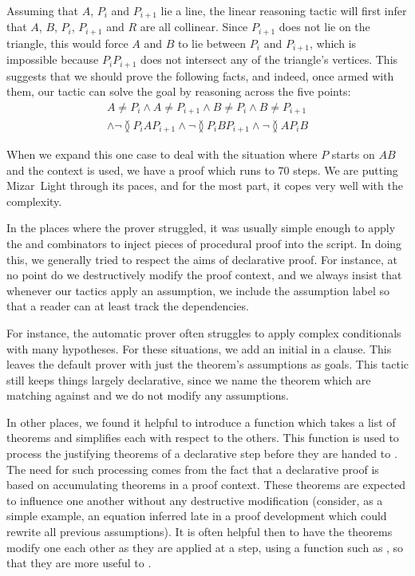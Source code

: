 Assuming that $A$, $P_i$ and $P_{i+1}$ lie a line, the linear reasoning tactic will first infer that $A$, $B$, $P_i$, $P_{i+1}$ and $R$ are all collinear. Since $P_{i+1}$ does not lie on the triangle, this would force $A$ and $B$ to lie between $P_i$ and $P_{i+1}$, which is impossible because $P_iP_{i+1}$ does not intersect any of the triangle's vertices. This suggests that we should prove the following facts, and indeed, once armed with them, our tactic can solve the goal by reasoning across the five points:
\begin{multline}
A \neq P_i \wedge A \neq P_{i+1} \wedge B \neq P_i \wedge B \neq P_{i+1}\\ \wedge \neg\between{P_i}{A}{P_{i+1}} \wedge \neg\between{P_i}{B}{P_{i+1}} \wedge \neg\between{A}{P_i}{B}
\end{multline}

When we expand this one case to deal with the situation where $P$ starts on $AB$ and the context is used, we have a proof which runs to 70 steps. We are putting Mizar~Light through its paces, and for the most part, it copes very well with the complexity.

In the places where the prover struggled, it was usually simple enough to apply the  and  combinators to inject pieces of procedural proof into the script. In doing this, we generally tried to respect the aims of declarative proof. For instance, at no point do we destructively modify the proof context, and we always insist that whenever our tactics apply an assumption, we include the assumption label so that a reader can at least track the dependencies.

For instance, the automatic prover often struggles to apply complex conditionals with many hypotheses. For these situations, we add an initial  in a  clause. This leaves the default prover  with just the theorem's assumptions as goals. This tactic still keeps things largely declarative, since we name the theorem which are matching against and we do not modify any assumptions. 

In other places, we found it helpful to introduce a function  which takes a list of theorems and simplifies each with respect to the others. This function is used to process the justifying theorems of a declarative step before they are handed to . The need for such processing comes from the fact that a declarative proof is based on accumulating theorems in a proof context. These theorems are expected to influence one another without any destructive modification (consider, as a simple example, an equation inferred late in a proof development which could rewrite all previous assumptions). It is often helpful then to have the theorems modify one each other as they are applied at a step, using a function such as , so that they are more useful to .

